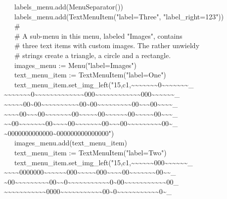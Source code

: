 {\>   \ \ \ labels\_menu.add(MenuSeparator()) \\
\>   \ \ \ labels\_menu.add(TextMenuItem("label=Three", "label\_right=123")) \\
\>   \ \ \ \# \\
\>   \ \ \ \# A sub-menu in this menu, labeled "Images", contains \\
\>   \ \ \ \# three text items with custom images. The rather unwieldy \\
\>   \ \ \ \# strings create a triangle, a circle and a rectangle. \\
\>   \ \ \ images\_menu := Menu("label=Images") \\
\>   \ \ \ text\_menu\_item := TextMenuItem("label=One") \\
\>   \ \ \ text\_menu\_item.set\_img\_left("15,c1,\~{}\~{}\~{}\~{}\~{}\~{}\~{}0\~{}\~{}\~{}\~{}\~{}\~{}\~{}\_ \\
\>\>\~{}\~{}\~{}\~{}\~{}\~{}\~{}0\~{}\~{}\~{}\~{}\~{}\~{}\~{}\~{}\~{}\~{}\~{}\~{}\~{}000\~{}\~{}\~{}\~{}\~{}\~{}\~{}\~{}\~{}\~{}\~{}\~{}000\~{}\~{}\~{}\~{}\~{}\~{}\_ \\
\>\>\~{}\~{}\~{}\~{}\~{}00\~{}00\~{}\~{}\~{}\~{}\~{}\~{}\~{}\~{}\~{}\~{}00\~{}00\~{}\~{}\~{}\~{}\~{}\~{}\~{}\~{}\~{}00\~{}\~{}\~{}00\~{}\~{}\~{}\~{}\_ \\
\>\>\~{}\~{}\~{}\~{}00\~{}\~{}\~{}00\~{}\~{}\~{}\~{}\~{}\~{}\~{}00\~{}\~{}\~{}\~{}\~{}00\~{}\~{}\~{}\~{}\~{}\~{}00\~{}\~{}\~{}\~{}\~{}00\~{}\~{}\~{}\_ \\
\>\>\~{}\~{}00\~{}\~{}\~{}\~{}\~{}\~{}\~{}00\~{}\~{}\~{}\~{}00\~{}\~{}\~{}\~{}\~{}\~{}\~{}00\~{}\~{}\~{}00\~{}\~{}\~{}\~{}\~{}\~{}\~{}\~{}\~{}00\~{}\_ \\
\>\>\~{}0000000000000\~{}000000000000000") \\
\>   \ \ \ images\_menu.add(text\_menu\_item) \\
\>   \ \ \ text\_menu\_item :=
TextMenuItem("label=Two") \\
\>   \ \ \ text\_menu\_item.set\_img\_left("15,c1,\~{}\~{}\~{}\~{}\~{}\~{}000\~{}\~{}\~{}\~{}\~{}\~{}\_ \\
\>\>\~{}\~{}\~{}\~{}0000000\~{}\~{}\~{}\~{}\~{}\~{}000\~{}\~{}\~{}\~{}\~{}000\~{}\~{}\~{}\~{}00\~{}\~{}\~{}\~{}\~{}\~{}\~{}00\~{}\~{}\_ \\
\>\>\~{}00\~{}\~{}\~{}\~{}\~{}\~{}\~{}\~{}\~{}00\~{}\~{}0\~{}\~{}\~{}\~{}\~{}\~{}\~{}\~{}\~{}\~{}\~{}0\~{}00\~{}\~{}\~{}\~{}\~{}\~{}\~{}\~{}\~{}\~{}\~{}00\_ \\
\>\~{}\~{}\~{}\~{}\~{}\~{}\~{}\~{}\~{}\~{}\~{}0000\~{}\~{}\~{}\~{}\~{}\~{}\~{}\~{}\~{}\~{}\~{}00\~{}0\~{}\~{}\~{}\~{}\~{}\~{}\~{}\~{}\~{}\~{}\~{}0\~{}\_ \\
}

